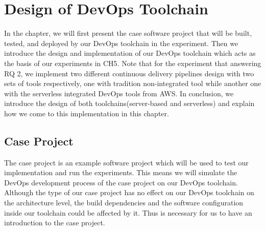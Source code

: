 \chapter{Design of DevOps Toolchain}
In the chapter, we will first present the case software project that will be built, tested, and deployed by our DevOps toolchain in the experiment. Then we introduce the design and implementation of our DevOps toolchain which acts as the basis of our experiments in CH5. Note that
for the experiment that answering RQ 2, we implement two different continuous delivery pipelines design with two sets of tools respectively, one with tradition non-integrated tool while another one with the serverless integrated DevOps tools from AWS. In conclusion, we introduce the design of both toolchains(server-based and serverless) and explain how we come to this implementation in this chapter. 
\section{Case Project}
The case project is an example software project which will be used to test our implementation and run the experiments. This means we will simulate the DevOps development process of the case project on our DevOps toolchain. Although the type of our case project has no effect on our DevOps toolchain on the architecture level, the build dependencies and the software configuration inside our toolchain could be affected by it. Thus is necessary for us to have an introduction to the case project.
